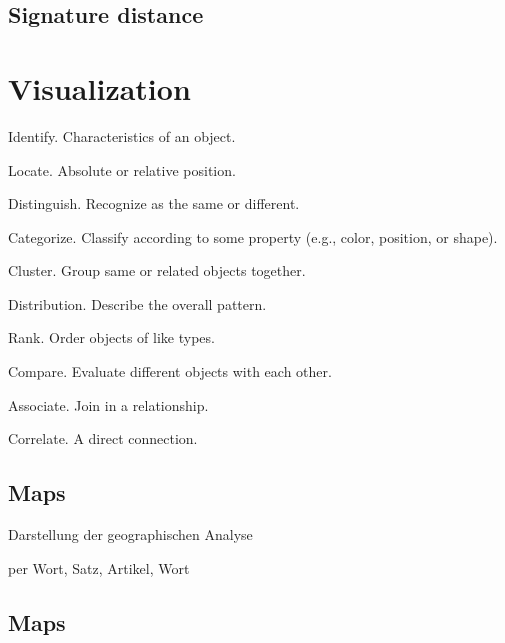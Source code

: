 \subsection{Signature distance}



\section{Visualization}\label{sec:visualization}



\begin{todos}
    \item {}
    \item Identify. Characteristics of an object.
    \item Locate. Absolute or relative position.
    \item Distinguish. Recognize as the same or different.
    \item Categorize. Classify according to some property (e.g., color, position, or shape).
    \item Cluster. Group same or related objects together.
    \item Distribution. Describe the overall pattern.
    \item Rank. Order objects of like types.
    \item Compare. Evaluate different objects with each other.
    \item Associate. Join in a relationship.
    \item Correlate. A direct connection.
\end{todos}

\subsection{Maps}

\begin{todos}
    \item Darstellung der geographischen Analyse
    \item per Wort, Satz, Artikel, Wort
\end{todos}

\subsection{Maps}


